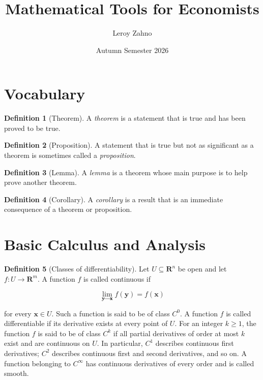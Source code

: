\documentclass{article}
\title{Mathematical Tools for Economists}
\author{Leroy Zahno}
\date{Autumn Semester 2026}
\theoremstyle{definition}
\newtheorem{definition}{Definition}
\theoremstyle{Solution}
\begin{document}
\maketitle
\tableofcontents

\section{Vocabulary}

\begin{definition}[Theorem]
A \textit{theorem} is a statement that is true and has been proved to be true. 
\end{definition}

\begin{definition}[Proposition]
A statement that is true but not as significant as a theorem is sometimes called a \textit{proposition}. 
\end{definition}

\begin{definition}[Lemma]
A \textit{lemma} is a theorem whose main purpose is to help prove another theorem. 
\end{definition}

\begin{definition}[Corollary]
A \textit{corollary} is a result that is an immediate consequence of a theorem or proposition.
\end{definition}

\section{Basic Calculus and Analysis}

\begin{definition}[Classes of differentiability]
Let $U \subseteq \textbf{R}^n$ be open and let $f:U \rightarrow \textbf{R}^m$. A function $f$ is called continuous if

\begin{equation}
	\lim_{\textbf{y} \rightarrow \textbf{x}} f(\textbf{y}) = f(\textbf{x})
\end{equation}

for every $\textbf{x} \in U$. Such a function is said to be of class $C^0$. A function $f$ is called differentiable if its derivative exists at every point of $U$. For an integer $k \geq 1$, the function $f$ is said to be of class $C^k$ if all partial derivatives of order at most $k$ exist and are continuous on $U$. In particular, $C^1$ describes continuous first derivatives; $C^2$ describes continuous first and second derivatives, and so on. A function belonging to $C^\infty$ has continuous derivatives of every order and is called smooth.
\end{definition}
\end{document}
